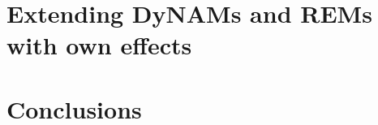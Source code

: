 \documentclass[article]{jss}
\begin{document}
\section[Extending DyNAMs and REMs with own effects]{Extending DyNAMs and REMs with own effects} \label{sec:extensions}

\section[Conclusions]{Conclusions} \label{sec:conclusions}


\end{document}
